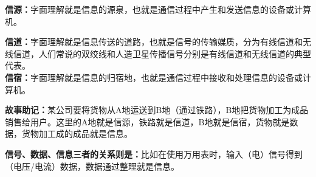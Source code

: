 \textbf{{信源：}}字面理解就是信息的源泉，也就是通信过程中产生和发送信息的设备或计算机。

\textbf{{信道：}}{}字面理解就是信息传送的道路，也就是信号的传输媒质，分为有线信道和无线信道，人们常说的双绞线和人造卫星传播信号分别是有线信道和无线信道的典型代表。\\

\textbf{{信宿：}}字面理解就是信息的归宿地，也就是通信过程中接收和处理信息的设备或计算机。

{\textbf{故事助记：}}某公司要将货物从A地运送到B地（通过铁路），B地把货物加工为成品销售给用户。这里的A地就是信源，铁路就是信道，B地就是信宿，货物就是数据，货物加工成的成品就是信息。

\textbf{{信号、数据、信息三者的关系则是：}}比如在使用万用表时，输入（电）信号得到（电压/电流）数据，数据通过整理就是信息。
